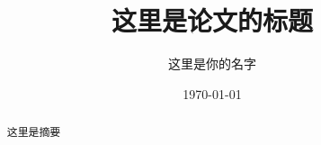 \documentclass[c4size]{ctexart}
\begin{document}
  \title{这里是论文的标题}
  \author{这里是你的名字}
  \date{\today}
  \maketitle
  \begin{abstract}
    这里是摘要
  \end{abstract}
\end{document}
